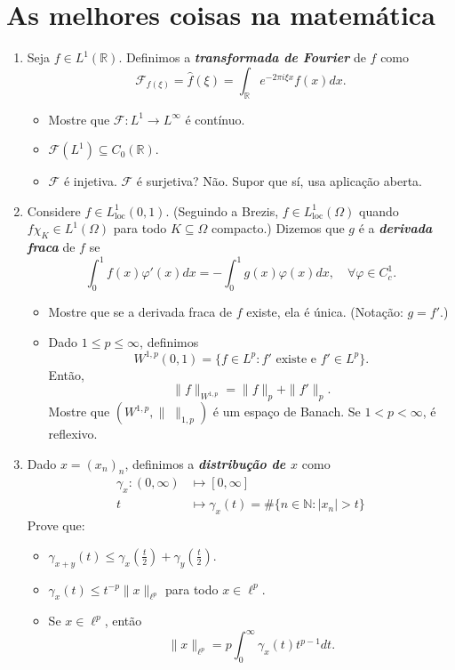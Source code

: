 \documentclass[portuguese]{article}
\theoremstyle{definition}
\newcommand{\R}{\mathbb{R}}
\newcommand{\N}{\mathbb{N}}
\begin{document}
\section{As melhores coisas na matemática}
\begin{enumerate}
	\item Seja $f\in L^1(\R)$. Definimos a \textbf{\textit{transformada de Fourier}} de $f$ como
	\[\mathcal{F}_{f(\xi)}=\hat{f}(\xi)=\int_\R e^{-2\pi i\xi x}f(x)dx.\]
	\begin{itemize}
		\item Mostre que $\mathcal{F}:L^1\to L^\infty$ é contínuo.
		\item $\mathcal{F}(L^1)\subseteq C_0(\R)$.
		\item $\mathcal{F}$ é injetiva. $\mathcal{F}$ é surjetiva? Não. Supor que sí, usa aplicação aberta.
	\end{itemize}
	\item Considere $f\in L_{\operatorname{loc}}^1(0,1)$. (Seguindo a Brezis, $f\in L^1_{\operatorname{loc}}(\Omega)$ quando $f\chi_K\in L^1(\Omega)$ para todo $K\subseteq\Omega$ compacto.) Dizemos que $g$ é a \textbf{\textit{derivada fraca}} de $f$ se
	\[\int_0^1f(x)\varphi'(x)dx=-\int_0^1g(x)\varphi(x)dx,\quad\forall\varphi\in C_c^1.\]
	\begin{itemize}
		\item Mostre que se a derivada fraca de $f$ existe, ela é única. (Notação: $g=f'$.)
		\item Dado $1\leq p\leq\infty$, definimos
		\[W^{1,p}(0,1)=\{f\in L^p:f'\text{ existe e }f'\in L^p\}.\]
		Então,
		\[\|f\|_{W^{1,p}}=\|f\|_p+\|f'\|_p.\]
		Mostre que $(W^{1,p},\|\;\|_{1,p})$ é um espaço de Banach. Se $1<p<\infty$, é reflexivo.
	\end{itemize}
	\item Dado $x=(x_n)_n$, definimos a \textbf{\textit{distribução de $x$}} como
	\begin{align*}
		\gamma_x:(0,\infty)&\mapsto[0,\infty]\\
		t&\mapsto\gamma_x(t)=\#\{n\in\N:|x_n|>t\}
	\end{align*}
	Prove que:
	\begin{itemize}
		\item $\gamma_{x+y}(t)\leq\gamma_x\left(\frac{t}{2}\right)+\gamma_y\left(\frac{t}{2}\right)$.
		\item $\gamma_x(t)\leq t^{-p}\|x\|_{\ell^p}$ para todo $x\in\ell^p$.
		\item Se $x\in\ell^p$, então
		\[\|x\|_{\ell^p}=p\int_0^\infty\gamma_x(t)t^{p-1}dt.\]

\end{itemize}
\end{enumerate}
\end{document}
